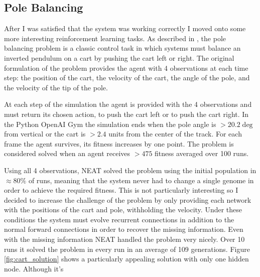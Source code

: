 \documentclass[letterpaper]{article}
\begin{document}
\subsection{Pole Balancing}  \label{sec:pole}
After I was satisfied that the system was working correctly I moved onto some more interesting reinforcement
learning tasks. As described in \cite{cartpole}, the pole balancing problem is a classic control task
in which systems must balance an inverted pendulum on a cart by pushing the cart left or right. The original
formulation of the problem provides the agent with 4 observations at each time step: the position of the
cart, the velocity of the cart, the angle of the pole, and the velocity of the tip of the pole. 

At each step 
of the simulation the agent is provided with the 4 observations and must return its chosen action, to push
the cart left or to push the cart right. In the Python OpenAI Gym \cite{gym} the simulation ends when the
pole angle is $> 20.2\deg$ from vertical or the cart is $> 2.4$ units from the center of the track. For each
frame the agent survives, its fitness increases by one point. The problem is considered solved when an agent
receives $> 475$ fitness averaged over 100 runs. 

Using all 4 observations, NEAT solved the problem using the initial population in $\approx80\%$ of runs, meaning
that the system never had to change a single genome in order to achieve the required fitness. This is not
particularly interesting so I decided to increase the challenge of the problem by only providing each network
with the positions of the cart and pole, withholding the velocity. Under these conditions the system must
evolve recurrent connections in addition to the normal forward connections in order to recover the missing
information. Even with the missing information NEAT handled the problem very nicely. Over 10 runs it solved
the problem in every run in an average of 109 generations. Figure \ref{fig:cart_solution} shows a particularly
appealing solution with only one hidden node. Although it's 
\end{document}
